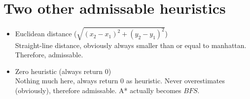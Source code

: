 \documentclass[12pt]{article}
\begin{document}
\section{Two other admissable heuristics}
\begin{itemize}
\item Euclidean distance  (\(\sqrt{(x_2 - x_1)^2 +(y_2 - y_1)^2 }\))\\
Straight-line distance, obviously always smaller than or equal to manhattan. Therefore, admissable.
\item Zero heuristic (always return 0) \\
Nothing much here, always return 0 as heuristic. Never overestimates (obviously), therefore admissable. A* actually becomes \(BFS\).
\end{itemize}
\end{document}
